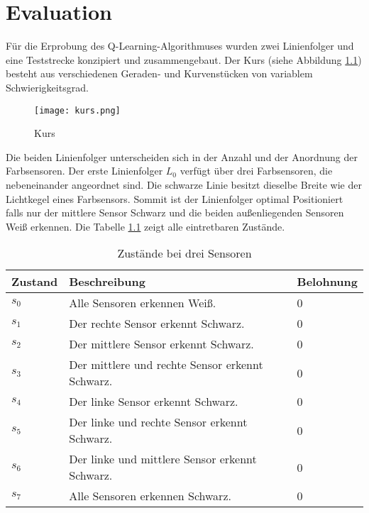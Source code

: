 \chapter{Evaluation} %
\label{cha:evaluation}

Für die Erprobung des Q-Learning-Algorithmuses wurden zwei Linienfolger und eine Teststrecke konzipiert und zusammengebaut. Der Kurs (siehe Abbildung \ref{fig:kurs}) besteht aus verschiedenen Geraden- und Kurvenstücken von variablem Schwierigkeitsgrad.

\begin{figure}[!htb]
	\centering
	\texttt{[image: kurs.png]}
	\caption{Kurs}
	\label{fig:kurs}
\end{figure}

Die beiden Linienfolger unterscheiden sich in der Anzahl und der Anordnung der Farbsensoren. Der erste Linienfolger $L_0$ verfügt über drei Farbsensoren, die nebeneinander angeordnet sind. Die schwarze Linie besitzt dieselbe Breite wie der Lichtkegel eines Farbsensors. Sommit ist der Linienfolger optimal Positioniert falls nur der mittlere Sensor Schwarz und die beiden außenliegenden Sensoren Weiß erkennen. Die Tabelle \ref{tab:zustaende_drei_sensoren} zeigt alle eintretbaren Zustände.

\begin{table}[h]
  \caption{Zustände bei drei Sensoren}
  \label{tab:zustaende_drei_sensoren}
  \renewcommand{\arraystretch}{1.2}
  \centering
  \sffamily
  \begin{footnotesize}
    \begin{tabular}{l l l}
    \toprule
    \textbf{Zustand} & \textbf{Beschreibung} & \textbf{Belohnung}\\
    \midrule
    $s_0$	&	Alle Sensoren erkennen Weiß.	&	0\\ %
    $s_1$	&	Der rechte Sensor erkennt Schwarz.	&	0\\ %
    $s_2$	&	Der mittlere Sensor erkennt Schwarz.	&	0\\ %
    $s_3$	&	Der mittlere und rechte Sensor erkennt Schwarz.	&	0\\ %
    $s_4$	&	Der linke Sensor erkennt Schwarz.	&	0\\ %
    $s_5$	&	Der linke und rechte Sensor erkennt Schwarz.	&	0\\ %
    $s_6$	&	Der linke und mittlere Sensor erkennt Schwarz.	&	0\\ %
    $s_7$	&	Alle Sensoren erkennen Schwarz.	&	0\\ %
    \bottomrule
    \end{tabular}
  \end{footnotesize}
  \rmfamily
\end{table}

